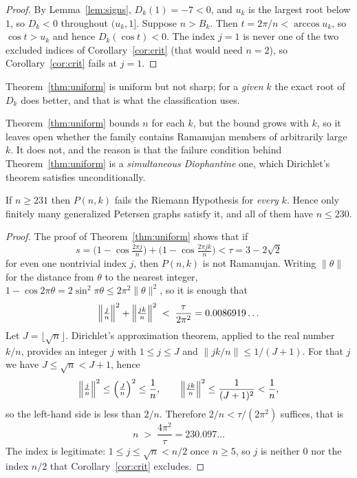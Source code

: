 \begin{proof}
By Lemma~\ref{lem:signs}, $D_k(1)=-7<0$, and $u_k$ is the largest root below
$1$, so $D_k<0$ throughout $(u_k,1]$. Suppose $n>B_k$. Then
$t=2\pi/n<\arccos u_k$, so $\cos t>u_k$ and hence $D_k(\cos t)<0$. The index
$j=1$ is never one of the two excluded indices of Corollary~\ref{cor:crit}
(that would need $n=2$), so Corollary~\ref{cor:crit} fails at $j=1$.
\end{proof}

Theorem~\ref{thm:uniform} is uniform but not sharp; for a \emph{given} $k$ the
exact root of $D_k$ does better, and that is what the classification uses.

Theorem~\ref{thm:uniform} bounds $n$ for each $k$, but the bound grows with
$k$, so it leaves open whether the family contains Ramanujan members of
arbitrarily large $k$. It does not, and the reason is that the failure
condition behind Theorem~\ref{thm:uniform} is a \emph{simultaneous Diophantine}
one, which Dirichlet's theorem satisfies unconditionally.

\begin{theorem}\label{thm:absolute}
If $n\ge231$ then $P(n,k)$ fails the Riemann Hypothesis for \emph{every} $k$.
Hence only finitely many generalized Petersen graphs satisfy it, and all of
them have $n\le230$.
\end{theorem}

\begin{proof}
The proof of Theorem~\ref{thm:uniform} shows that if
\[
  s=\bigl(1-\cos\tfrac{2\pi j}{n}\bigr)+\bigl(1-\cos\tfrac{2\pi jk}{n}\bigr)<\tau=3-2\sqrt2
\]
for even one nontrivial index $j$, then $P(n,k)$ is not Ramanujan. Writing
$\|\theta\|$ for the distance from $\theta$ to the nearest integer,
$1-\cos2\pi\theta=2\sin^{2}\pi\theta\le2\pi^{2}\|\theta\|^{2}$, so it is enough
that
\[
  \Bigl\|\tfrac jn\Bigr\|^{2}+\Bigl\|\tfrac{jk}{n}\Bigr\|^{2}
  \;<\;\frac{\tau}{2\pi^{2}}=0.0086919\ldots
\]
Let $J=\lfloor\sqrt n\rfloor$. Dirichlet's approximation theorem, applied to
the real number $k/n$, provides an integer $j$ with $1\le j\le J$ and
$\|jk/n\|\le1/(J+1)$. For that $j$ we have $J\le\sqrt n<J+1$, hence
\[
  \Bigl\|\tfrac jn\Bigr\|^{2}\le\Bigl(\tfrac Jn\Bigr)^{2}\le\frac1n,
  \qquad
  \Bigl\|\tfrac{jk}{n}\Bigr\|^{2}\le\frac{1}{(J+1)^{2}}<\frac1n ,
\]
so the left-hand side is less than $2/n$. Therefore $2/n<\tau/(2\pi^{2})$
suffices, that is
\[
  n\;>\;\frac{4\pi^{2}}{\tau}=230.097\ldots
\]
The index is legitimate: $1\le j\le\sqrt n<n/2$ once $n\ge5$, so $j$ is neither
$0$ nor the index $n/2$ that Corollary~\ref{cor:crit} excludes.
\end{proof}

